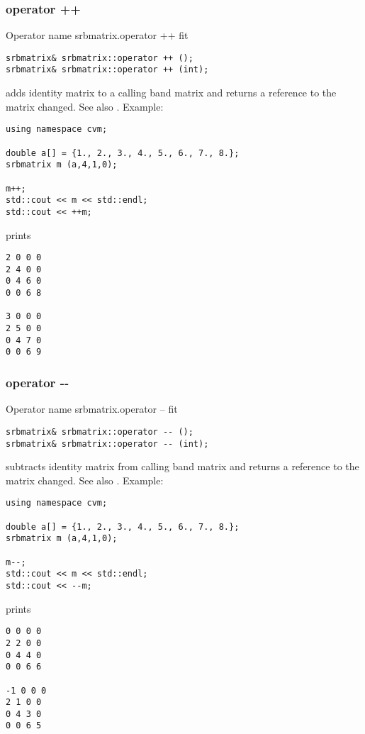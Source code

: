 \subsubsection{operator ++}
Operator%
\pdfdest name {srbmatrix.operator ++} fit
\begin{verbatim}
srbmatrix& srbmatrix::operator ++ ();
srbmatrix& srbmatrix::operator ++ (int);
\end{verbatim}
adds identity matrix to a calling band matrix
and returns a reference to
the matrix changed.
See also .
Example:
\begin{Verbatim}
using namespace cvm;

double a[] = {1., 2., 3., 4., 5., 6., 7., 8.};
srbmatrix m (a,4,1,0);

m++;
std::cout << m << std::endl;
std::cout << ++m;
\end{Verbatim}
prints
\begin{Verbatim}
2 0 0 0
2 4 0 0
0 4 6 0
0 0 6 8

3 0 0 0
2 5 0 0
0 4 7 0
0 0 6 9
\end{Verbatim}
\newpage



\subsubsection{operator -{}-}
Operator%
\pdfdest name {srbmatrix.operator --} fit
\begin{verbatim}
srbmatrix& srbmatrix::operator -- ();
srbmatrix& srbmatrix::operator -- (int);
\end{verbatim}
subtracts identity matrix from  calling band matrix
and returns a reference to
the matrix changed.
See also .
Example:
\begin{Verbatim}
using namespace cvm;

double a[] = {1., 2., 3., 4., 5., 6., 7., 8.};
srbmatrix m (a,4,1,0);

m--;
std::cout << m << std::endl;
std::cout << --m;
\end{Verbatim}
prints
\begin{Verbatim}
0 0 0 0
2 2 0 0
0 4 4 0
0 0 6 6

-1 0 0 0
2 1 0 0
0 4 3 0
0 0 6 5
\end{Verbatim}
\newpage



